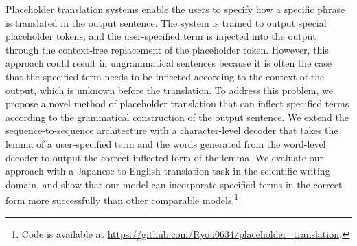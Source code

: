 Placeholder translation systems enable the users to specify how a specific phrase is translated in the output sentence.
The system is trained to output special placeholder tokens, and the user-specified term is injected into the output through the context-free replacement of the placeholder token.
However, this approach could result in ungrammatical sentences because it is often the case that the specified term needs to be inflected according to the context of the output, which is unknown before the translation.
To address this problem, we propose a novel method of placeholder translation that can inflect specified terms according to the grammatical construction of the output sentence.
We extend the sequence-to-sequence architecture with a character-level decoder that takes the lemma of a user-specified term and the words generated from the word-level decoder to output the correct inflected form of the lemma.
We evaluate our approach with a Japanese-to-English translation task in the scientific writing domain, and show that our model can incorporate specified terms in the correct form more successfully than other comparable models.\footnote{Code is available at \url{https://github.com/Ryou0634/placeholder_translation}.}
